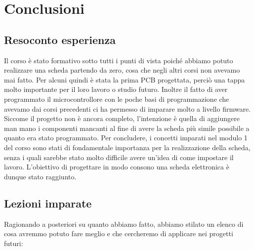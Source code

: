 \chapter{Conclusioni}

\hypertarget{resoconto-esperienza}{%
\section{\texorpdfstring{Resoconto esperienza
}{Resoconto esperienza }}\label{resoconto-esperienza}}

Il corso è stato formativo sotto tutti i punti di vista poiché abbiamo
potuto realizzare una scheda partendo da zero, cosa che negli altri
corsi non avevamo mai fatto. Per alcuni quindi è stata la prima PCB
progettata, perciò una tappa molto importante per il loro lavoro o
studio futuro. Inoltre il fatto di aver programmato il microcontrollore
con le poche basi di programmazione che avevamo dai corsi precedenti ci
ha permesso di imparare molto a livello firmware. Siccome il progetto
non è ancora completo, l'intenzione è quella di aggiungere man mano i
componenti mancanti al fine di avere la scheda più simile possibile a
quanto era stato programmato. Per concludere, i concetti imparati nel
modulo 1 del corso sono stati di fondamentale importanza per la
realizzazione della scheda, senza i quali sarebbe stato molto difficile
avere un'idea di come impostare il lavoro. L'obiettivo di progettare in
modo consono una scheda elettronica è dunque stato raggiunto.

\hypertarget{lezioni-imparate}{%
\section{Lezioni imparate}\label{Lezioni-imparate}}

Ragionando a posteriori su quanto abbiamo fatto, abbiamo stilato un
elenco di cosa avremmo potuto fare meglio e che cercheremo di applicare
nei progetti futuri:

